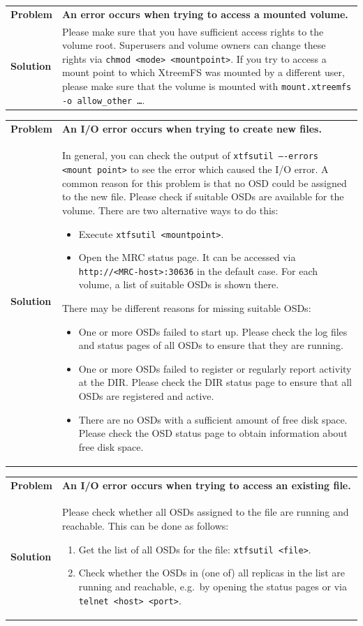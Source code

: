 \documentclass[a4paper,10pt]{book}
\begin{document}
\begin{tabular}{lp{10cm}}
 \textbf{Problem}  & \textbf{An error occurs when trying to access a mounted volume.} \\
 \textbf{Solution} & Please make sure that you have sufficient access rights to the volume root. Superusers and volume owners can change these rights via \texttt{chmod <mode> <mountpoint>}. If you try to access a mount point to which XtreemFS was mounted by a different user, please make sure that the volume is mounted with \texttt{mount.xtreemfs -o allow\_other \dots}.
\end{tabular}

\begin{tabular}{lp{10cm}}
 \textbf{Problem}  & \textbf{An I/O error occurs when trying to create new files.} \\
 \textbf{Solution} & In general, you can check the output of \texttt{xtfsutil ----errors <mount point>} to see the error which caused the I/O error. A common reason for this problem is that no OSD could be assigned to the new file. Please check if suitable OSDs are available for the volume. There are two alternative ways to do this:
   \begin{itemize}
     \item Execute \texttt{xtfsutil <mountpoint>}.
     \item Open the MRC status page. It can be accessed via \texttt{http://<MRC-host>:30636} in the default case. For each volume, a list of suitable OSDs is shown there.
   \end{itemize}
 There may be different reasons for missing suitable OSDs:
   \begin{itemize}
    \item One or more OSDs failed to start up. Please check the log files and status pages of all OSDs to ensure that they are running.
    \item One or more OSDs failed to register or regularly report activity at the DIR. Please check the DIR status page to ensure that all OSDs are registered and active.
    \item There are no OSDs with a sufficient amount of free disk space. Please check the OSD status page to obtain information about free disk space.
   \end{itemize}
\end{tabular}

\begin{tabular}{lp{10cm}}
 \textbf{Problem}  & \textbf{An I/O error occurs when trying to access an existing file.}\\
 \textbf{Solution} & Please check whether all OSDs assigned to the file are running and reachable. This can be done as follows:
    \begin{enumerate}
     \item Get the list of all OSDs for the file: \texttt{xtfsutil <file>}.
     \item Check whether the OSDs in (one of) all replicas in the list are running and reachable, e.g.\ by opening the status pages or via \texttt{telnet <host> <port>}.
    \end{enumerate}
\end{tabular}
\end{document}
